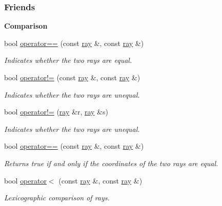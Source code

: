 \subsubsection*{Friends}
\begin{Indent}\textbf{ Comparison}\par
\begin{DoxyCompactItemize}
\item 
bool \hyperlink{group___c_l_s_solvers_ae27bf49e1b2756797f82fea0bf810dfd}{operator==} (const \hyperlink{group___c_l_s_solvers_classray}{ray} \&, const \hyperlink{group___c_l_s_solvers_classray}{ray} \&)
\begin{DoxyCompactList}\small\item\em Indicates whether the two rays are equal. \end{DoxyCompactList}\item 
bool \hyperlink{group___c_l_s_solvers_a22b7d226858aa935e739c696065e4680}{operator!=} (const \hyperlink{group___c_l_s_solvers_classray}{ray} \&, const \hyperlink{group___c_l_s_solvers_classray}{ray} \&)
\begin{DoxyCompactList}\small\item\em Indicates whether the two rays are unequal. \end{DoxyCompactList}\item 
bool \hyperlink{group___c_l_s_solvers_a088bbdf2a6fc03509fc660aa3aee110e}{operator!=} (\hyperlink{group___c_l_s_solvers_classray}{ray} \&r, \hyperlink{group___c_l_s_solvers_classray}{ray} \&s)
\begin{DoxyCompactList}\small\item\em Indicates whether the two rays are unequal. \end{DoxyCompactList}\item 
bool \hyperlink{group___c_l_s_solvers_ae27bf49e1b2756797f82fea0bf810dfd}{operator==} (const \hyperlink{group___c_l_s_solvers_classray}{ray} \&, const \hyperlink{group___c_l_s_solvers_classray}{ray} \&)
\begin{DoxyCompactList}\small\item\em Returns {\ttfamily true} if and only if the coordinates of the two rays are equal. \end{DoxyCompactList}\item 
bool \hyperlink{group___c_l_s_solvers_a5909f048e7cf014f880adb43da3862d3}{operator$<$} (const \hyperlink{group___c_l_s_solvers_classray}{ray} \&, const \hyperlink{group___c_l_s_solvers_classray}{ray} \&)
\begin{DoxyCompactList}\small\item\em Lexicographic comparison of rays. \end{DoxyCompactList}\end{DoxyCompactItemize}
\end{Indent}
